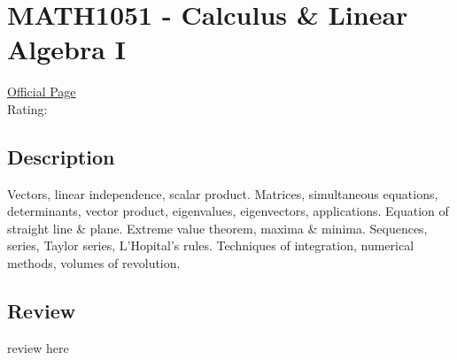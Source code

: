 \hypertarget{MATH1051}{\section{MATH1051 - Calculus \& Linear Algebra I}}

\large
\textcolor{turbo_purple}{\href{https://my.uq.edu.au/programs-courses/course.html?course_code=MATH1051}{Official Page}} \\
Rating: \cstar\cstar\cstar\cstar\ostar

\normalsize
\subsection*{Description}
Vectors, linear independence, scalar product.
Matrices, simultaneous equations, determinants, vector product, eigenvalues, eigenvectors, applications.
Equation of straight line \& plane.
Extreme value theorem, maxima \& minima.
Sequences, series, Taylor series, L'Hopital's rules.
Techniques of integration, numerical methods, volumes of revolution.

\subsection*{Review}
review here
